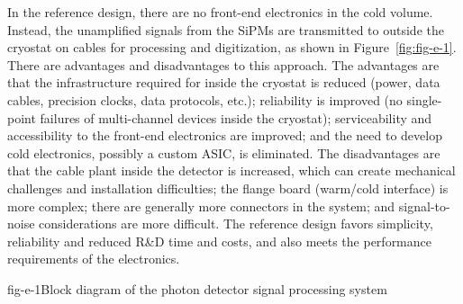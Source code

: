 In the reference design, there are no front-end electronics in the cold
volume.  Instead, the unamplified signals from the SiPMs are
transmitted to outside the cryostat on cables for processing and
digitization, as shown in Figure~\ref{fig:fig-e-1}.  There are
advantages and disadvantages to this approach.  The advantages are
that the infrastructure required for inside the cryostat is reduced
(power, data cables, precision clocks, data protocols, etc.);
reliability is improved (no single-point failures of multi-channel
devices inside the cryostat); serviceability and accessibility to the
front-end electronics are improved; and the need to develop cold
electronics, possibly a custom ASIC, is eliminated.  The disadvantages
are that the cable plant inside the detector is increased, which can
create mechanical challenges and installation difficulties; the flange
board (warm/cold interface) is more complex; there are generally more
connectors in the system; and signal-to-noise considerations are more
difficult.  %
The reference design favors simplicity,
reliability and reduced R\&D time and costs, and also meets the
performance requirements of the electronics.
%
%
\begin{cdrfigure}{fig-e-1}{Block diagram of the photon detector signal processing system}
\end{cdrfigure}

